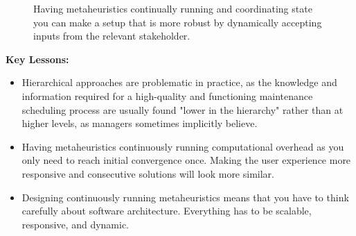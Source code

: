 \begin{figure}[H]
	\centering
	
	\caption{
		Having metaheuristics continually running and coordinating state you can make a setup that is more robust by dynamically accepting inputs from the relevant stakeholder.  
	}
	\label{fig:asynchronous_model_setup}
\end{figure}

\textbf{Key Lessons:}
\begin{itemize}
	\item Hierarchical approaches are problematic in practice, as the knowledge and information required for a high-quality and functioning maintenance 
		  scheduling process are usually found "lower in the hierarchy" rather than at higher levels, as managers sometimes implicitly believe.
	\item Having metaheuristics continuously running computational overhead as you only need to reach initial convergence once. Making the 
	      user experience more responsive and consecutive solutions will look more similar. \citep{albaMetaheuristicsDynamicOptimization2013a} \citep{yangEvolutionaryComputationDynamic2015}
	\item Designing continuously running metaheuristics means that you have to think carefully about software architecture. Everything has to
		  be scalable, responsive, and dynamic. 
\end{itemize}

